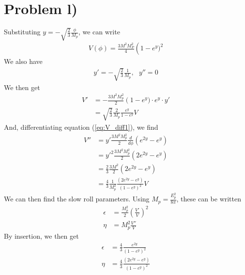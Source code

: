 \documentclass[reprint,english,notitlepage]{revtex4-1}  %
\numberwithin{equation}{section}
\begin{document}
\section{Problem l)} \label{section:problem_l}
Substituting $y=-\sqrt{\frac{2}{3}}\frac{\phi}{M_p}$, we can write
\begin{align}
	V(\phi) = \frac{3 M^2 M_P^2}{4} \left(1-e^y)^2
\end{align}
We also have
\begin{align}
	y' = -\sqrt{\frac{2}{3}}\frac{1}{M_p}, \ \ \ y'' = 0
\end{align}
We then get
\begin{align}
	V' &= -\frac{3 M^2 M_p^2}{2}\left(1 - e^y) \cdot e^y \cdot y' \label{eq:V_diff1} \\
		 &= \sqrt{\frac{2}{3}} \frac{2}{M_p} \frac{e^y}{1-e^y} V
\end{align}
And, differentiating equation (\ref{eq:V_diff1}), we find
\begin{align}
	V'' &= y' \frac{3M^2 M_p^2}{2} \frac{d}{d\phi}\left( e^{2y} - e^y \right) \\
			&= y'^2 \frac{3M^2 M_p^2}{2}\left( 2e^{2y}- e^y \right) \\
			&= \frac{2}{3}\frac{3M^2}{2}\left( 2e^{2y} - e^y \right) \\
			&= \frac{4}{3}\frac{1}{M_p^2}\frac{\left(2e^{2y} - e^y\right)}{\left( 1 - e^y\right)^2} V
\end{align}
We can then find the slow roll parameters. Using $M_p = \frac{E_p^2}{8\pi}$,
these can be written
\begin{align}
	\epsilon &= \frac{M_p^2}{2} \left(\frac{V'}{V}\right)^2 \\
  \eta 		 &= M_p^2 \frac{V''}{V}
\end{align}
By insertion, we then get
\begin{align}
	\epsilon &= \frac{4}{3}\frac{e^{2y}}{\left( 1 - e^y \right)^2} \\
  \eta 		 &= \frac{4}{3} \frac{\left(2e^{2y} - e^y\right)}{\left( 1 - e^y\right)^2}
\end{align}
\end{document}
